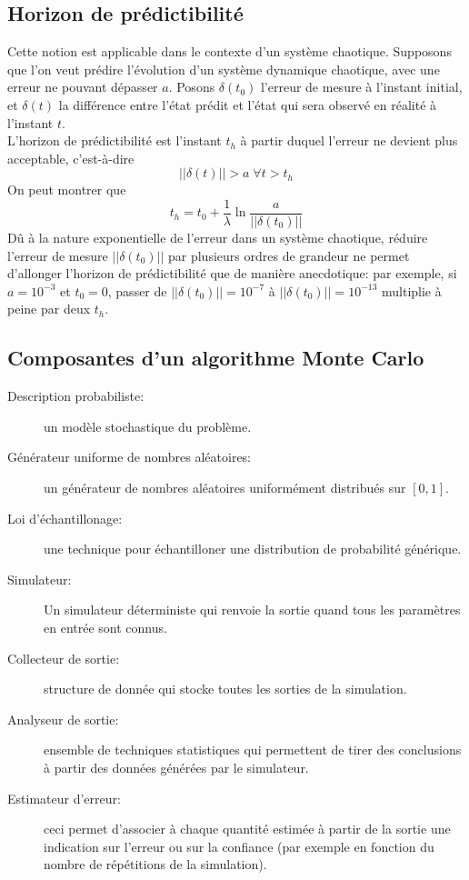 \documentclass[a4paper]{article}
\begin{document}
\subsection{Horizon de prédictibilité}
Cette notion est applicable dans le contexte d'un système chaotique. Supposons
que l'on veut prédire l'évolution d'un système dynamique chaotique, avec une
erreur ne pouvant dépasser \(a\). Posons \(\delta(t_0)\) l'erreur de mesure à
l'instant initial, et \(\delta(t)\) la différence entre l'état prédit et l'état
qui sera observé en réalité à l'instant \(t\).\\
L'horizon de prédictibilité est l'instant \(t_h\) à partir duquel l'erreur ne
devient plus acceptable, c'est-à-dire \[||\delta(t)||>a\;\forall t>t_h\]
On peut montrer que
\[t_h=t_0+\frac{1}{\lambda}\ln\frac{a}{||\delta(t_0)||}\]
Dû à la nature exponentielle de l'erreur dans un système chaotique, réduire
l'erreur de mesure \(||\delta(t_0)||\) par plusieurs ordres de grandeur ne
permet d'allonger l'horizon de prédictibilité que de manière anecdotique: par
exemple, si \(a=10^{-3}\) et \(t_0=0\), passer de \(||\delta(t_0)||=10^{-7}\)
à \(||\delta(t_0)||=10^{-13}\) multiplie à peine par deux \(t_h\).

\subsection{Composantes d'un algorithme Monte Carlo}
\begin{description}
	\item[Description probabiliste:] un modèle stochastique du problème.
	\item[Générateur uniforme de nombres aléatoires:]un générateur de
		nombres aléatoires uniformément distribués sur \([0,1]\).
	\item[Loi d'échantillonage:]une technique pour échantilloner une
		distribution de probabilité générique.
	\item[Simulateur:]Un simulateur déterministe qui renvoie la sortie
		quand tous les paramètres en entrée sont connus.
	\item[Collecteur de sortie:]structure de donnée qui stocke toutes
		les sorties de la simulation.
	\item[Analyseur de sortie:]ensemble de techniques statistiques qui
		permettent de tirer des conclusions à partir des données
		générées par le simulateur.
	\item[Estimateur d'erreur:]ceci permet d'associer à chaque quantité
		estimée à partir de la sortie une indication sur l'erreur ou sur
		la confiance (par exemple en fonction du nombre de répétitions
		de la simulation).
\end{description}
\end{document}
